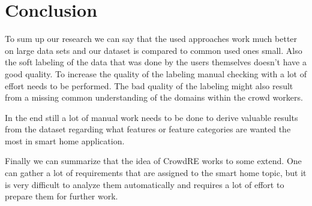 \section{Conclusion} %
\label{sec:conclusion}

To sum up our research we can say that the used approaches work much better on large data sets and our dataset is compared to common used ones small. Also the soft labeling of the data that was done by the users themselves doesn't have a good quality. To increase the quality of the labeling manual checking with a lot of effort needs to be performed. The bad quality of the labeling might also result from a missing common understanding of the domains within the crowd workers.

In the end still a lot of manual work needs to be done to derive valuable results from the dataset regarding what features or feature categories are wanted the most in smart home application.

Finally we can summarize that the idea of CrowdRE works to some extend. One can gather a lot of requirements that are assigned to the smart home topic, but it is very difficult to analyze them automatically and requires a lot of effort to prepare them for further work.

